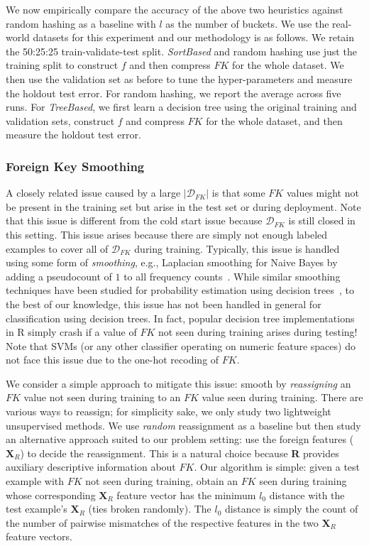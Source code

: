 \documentclass[sigconf]{acmart}
\begin{document}
We now empirically compare the accuracy of the above two heuristics against random hashing as a baseline with $l$ as the number of buckets. 
We use the real-world datasets for this experiment and our methodology is as follows. We retain the 50:25:25 train-validate-test split.
\textit{SortBased} and random hashing use just the training split to construct $f$ and then compress $FK$ for the whole dataset. We then use
the validation set as before to tune the hyper-parameters and measure the holdout test error. For random hashing, we report the average across 
five runs. For \textit{TreeBased}, we first learn a decision tree using the original training and validation sets, construct $f$ and compress 
$FK$ for the whole dataset, and then measure the holdout test error.


\subsubsection{Foreign Key Smoothing}

A closely related issue caused by a large $|\mathcal{D}_{FK}|$ is that some $FK$ values might not be present in the training set but arise 
in the test set or during deployment. Note that this issue is different from the cold start issue because $\mathcal{D}_{FK}$ is still closed 
in this setting. This issue arises because there are simply not enough labeled examples to cover 
all of $\mathcal{D}_{FK}$ during training. Typically, this issue is handled using some form of \textit{smoothing}, e.g., Laplacian smoothing
for Naive Bayes by adding a pseudocount of $1$ to all frequency counts~\cite{mitchellbook}.
While similar smoothing techniques have been studied for probability estimation using decision trees~\cite{pedro2003}, to the best of our knowledge, 
this issue has not been handled in general for classification using decision trees. In fact, popular decision tree implementations in R simply 
crash if a value of $FK$ not seen during training arises during testing! Note that SVMs (or any other classifier operating on numeric 
feature spaces) do not face this issue due to the one-hot recoding of $FK$. 

We consider a simple approach to mitigate this issue: smooth by \textit{reassigning} an $FK$ value not seen during training to an $FK$ value 
seen during training. There are various ways to reassign; for simplicity sake, we only study two lightweight unsupervised methods. 
We use \textit{random} reassignment as a baseline but then study an alternative approach suited to our problem setting: use the foreign features 
($\textbf{X}_R$) to decide the reassignment. This is a natural choice because \textbf{R} provides auxiliary descriptive information about $FK$.
Our algorithm is simple: given a test example with $FK$ not seen during training, obtain an $FK$ seen during training whose corresponding 
$\textbf{X}_R$ feature vector has the minimum $l_0$ distance with the test example's $\textbf{X}_R$ (ties broken randomly). The $l_0$ distance is
simply the count of the number of pairwise mismatches of the respective features in the two $\textbf{X}_R$ feature vectors. 
\end{document}
